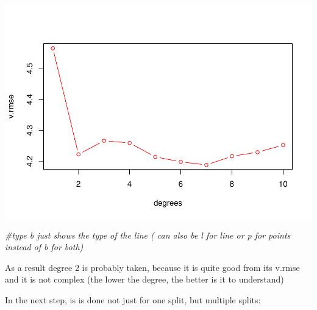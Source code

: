 \documentclass[]{report}
\newenvironment{Shaded}{\begin{snugshade}}{\end{snugshade}}
\newcommand{\CommentTok}[1]{\textcolor[rgb]{0.56,0.35,0.01}{\textit{#1}}}
\begin{document}
\includegraphics{MyBook_files/figure-latex/unnamed-chunk-135-1.pdf}

\begin{Shaded}
\begin{Highlighting}[]
\CommentTok{#type b just shows the type of the line ( can also be l for line or p for points instead of b for both)}
\end{Highlighting}
\end{Shaded}

As a result degree 2 is probably taken, because it is quite good from
its v.rmse and it is not complex (the lower the degree, the better is it
to understand)

In the next step, is is done not just for one split, but multiple
splits:
\end{document}
